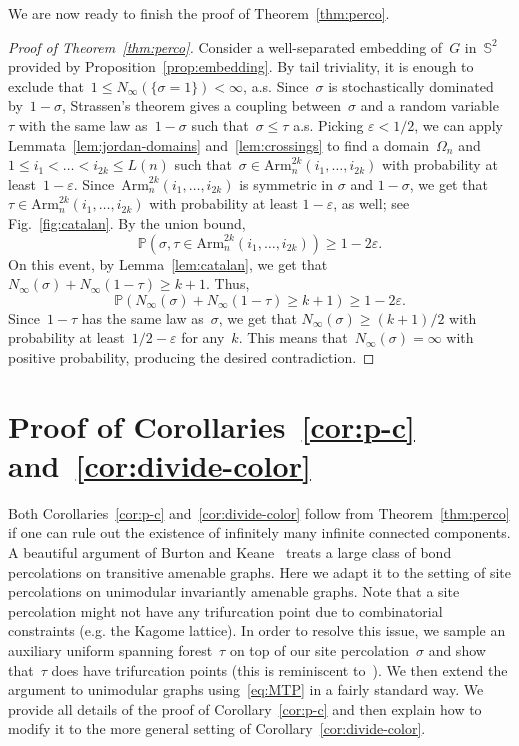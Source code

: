 \documentclass[11pt,letterpaper]{amsart}
\newcounter{n}
\numberwithin{n}{section}
\theoremstyle{plain}
\theoremstyle{definition}
\theoremstyle{remark}
\newcommand\bbS{\mathbb S}
\renewcommand\P{\mathbb P}
\newcommand\domain\Omega
\newcommand{\1}{\mathbbm{1}}
\begin{document}
We are now ready to finish the proof of Theorem~\ref{thm:perco}.

\begin{proof}[Proof of Theorem~\ref{thm:perco}]
	Consider a well-separated embedding of~$G$ in~$\bbS^2$ provided by Proposition~\ref{prop:embedding}.
	By tail triviality, it is enough to exclude that~$1 \leq N_{\infty}(\{\sigma=1\}) < \infty$, a.s.
	Since~$\sigma$ is stochastically dominated by~$1-\sigma$, Strassen's theorem gives a coupling between~$\sigma$ and a random variable~$\tau$ with the same law as~$1-\sigma$ such that~$\sigma\leq \tau$ a.s. 
	Picking $\varepsilon < 1/2$, we can apply Lemmata~\ref{lem:jordan-domains} and~\ref{lem:crossings} to find a domain~$\domain_n$ and~$1\leq i_1<\dots<i_{2k}\leq L(n)$ such that~$\sigma \in \mathrm{Arm}_n^{2k}(i_1,\dots,i_{2k})$ with probability at least~$1-\varepsilon$.
	Since~$\mathrm{Arm}_n^{2k}(i_1,\dots,i_{2k})$ is symmetric in $\sigma$ and $1 - \sigma$, we get that $\tau \in \mathrm{Arm}_n^{2k}(i_1,\dots,i_{2k})$ with probability at least $1 - \varepsilon$, as well; see Fig.~\ref{fig:catalan}.
	By the union bound,
	\[
		\P(\sigma, \tau\in \mathrm{Arm}_n^{2k}(i_1,\dots,i_{2k})) \geq 1-2\varepsilon.
	\]
	On this event, by Lemma~\ref{lem:catalan}, we get that~$N_\infty(\sigma) + N_\infty(1-\tau) \geq k+1$.
	Thus,
	\[
		\P(N_\infty(\sigma) + N_\infty(1-\tau) \geq k+1) \geq 1-2\varepsilon.
	\]
 Since~$1-\tau$ has the same law as~$\sigma$, we get that $N_\infty(\sigma)\geq (k+1)/2$ with probability at least~$1/2-\varepsilon$ for any~$k$. This means that~$N_\infty(\sigma)=\infty$ with positive probability, producing the desired contradiction.
\end{proof}


\section{Proof of Corollaries~\ref{cor:p-c} and~\ref{cor:divide-color}}
\label{section:divide-color}

Both Corollaries~\ref{cor:p-c} and~\ref{cor:divide-color} follow from Theorem~\ref{thm:perco} if one can rule out the existence of infinitely many infinite connected components.
A beautiful argument of Burton and Keane~\cite{BurKea89} treats a large class of bond percolations on transitive amenable graphs.
Here we adapt it to the setting of site percolations on unimodular invariantly amenable graphs.
Note that a site percolation might not have any trifurcation point due to combinatorial constraints (e.g. the Kagome lattice).
In order to resolve this issue, we sample an auxiliary uniform spanning forest~$\tau$ on top of our site percolation~$\sigma$ and show that~$\tau$ does have trifurcation points (this is reminiscent to~\cite[Lemma~$7.7$]{LyoPer17}).
We then extend the argument to unimodular graphs using~\eqref{eq:MTP} in a fairly standard way.
We provide all details of the proof of Corollary~\ref{cor:p-c} and then explain how to modify it to the more general setting of Corollary~\ref{cor:divide-color}.
\end{document}
